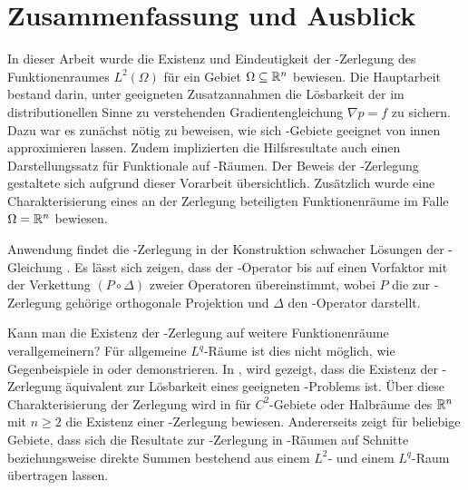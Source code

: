 \chapter{Zusammenfassung und Ausblick}

In dieser Arbeit wurde die Existenz und Eindeutigkeit der \helmholtz\hyp{}Zerlegung des Funktionenraumes $L^2(\Omega)$ für ein Gebiet $\Omega \subseteq \mathbb{R}^n$ bewiesen.
Die Hauptarbeit bestand darin, unter geeigneten Zusatzannahmen die Lösbarkeit der im distributionellen Sinne zu verstehenden Gradientengleichung $\nabla p = f$ zu sichern.
Dazu war es zunächst nötig zu beweisen, wie sich \lipschitz\hyp{}Gebiete geeignet von innen approximieren lassen.
Zudem implizierten die Hilfsresultate auch einen Darstellungssatz für Funktionale auf \sobolev\hyp{}Räumen.
Der Beweis der \helmholtz\hyp{}Zerlegung gestaltete sich aufgrund dieser Vorarbeit übersichtlich.
Zusätzlich wurde eine Charakterisierung eines an der Zerlegung beteiligten Funktionenräume im Falle $\Omega = \mathbb{R}^n$ bewiesen.

Anwendung findet die \helmholtz\hyp{}Zerlegung in der Konstruktion schwacher Lösungen der \stokes\hyp{}Gleichung \cite[S.129f.]{sohr2001navier}. 
Es lässt sich zeigen, dass der \stokes\hyp{}Operator bis auf einen Vorfaktor mit der Verkettung $(P \circ \Delta)$ zweier Operatoren übereinstimmt, wobei $P$ die zur \helmholtz\hyp{}Zerlegung gehörige orthogonale Projektion und $\Delta$ den \laplace\hyp{}Operator darstellt.

Kann man die Existenz der \helmholtz\hyp{}Zerlegung auf weitere Funktionenräume verallgemeinern?
Für allgemeine $L^q$\hyp{}Räume ist dies nicht möglich, wie Gegenbeispiele in \cite{maslennikova1986elliptic} oder \cite{bogovski1986decomposition} demonstrieren.
In \cite{simader1992new}, \cite[S.146, Lemma III.1.2]{galdi2011navier} wird gezeigt, dass die Existenz der \helmholtz\hyp{}Zerlegung äquivalent zur Lösbarkeit eines geeigneten \neumann\hyp{}Problems ist. 
Über diese Charakterisierung der Zerlegung wird in \cite[S.152, Theorem III.1.2]{galdi2011navier} für $C^2$-Gebiete oder Halbräume des $\mathbb{R}^n$ mit $n \geq 2$ die Existenz einer \helmholtz\hyp{}Zerlegung bewiesen.
Andererseits zeigt \cite{farwig05anLq} für beliebige Gebiete, dass sich die Resultate zur \helmholtz\hyp{}Zerlegung in \hilbert\hyp{}Räumen auf Schnitte beziehungsweise direkte Summen bestehend aus einem $L^2$- und einem $L^q$\hyp{}Raum übertragen lassen.

